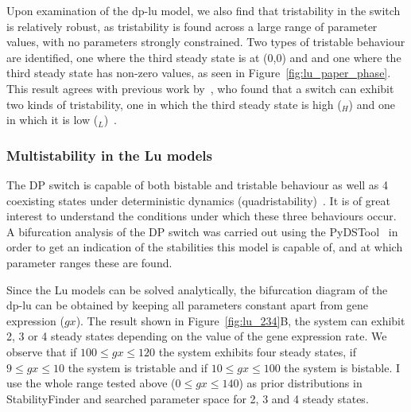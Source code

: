 Upon examination of the \acrshort{dp-lu} model, we also find that tristability in the switch is relatively robust, as tristability is found across a large range of parameter values, with no parameters strongly constrained. Two types of tristable behaviour are identified, one where the third steady state is at (0,0) and and one where the third steady state has non-zero values, as seen in Figure~\ref{fig:lu_paper_phase}. This result agrees with previous work by~\textcite{Guantes:2008gs}, who found that a switch can exhibit two kinds of tristability, one in which the third steady state is high ($_H$) and one in which it is low ($_L$)~\autocite{Guantes:2008gs}. %

\subsubsection{Multistability in the Lu models}
\label{sec:lu_234}
The DP switch is capable of both bistable and tristable behaviour as well as 4 coexisting states under deterministic dynamics (quadristability)~\autocite{Guantes:2008gs}. It is of great interest to understand the conditions under which these three behaviours occur. A bifurcation analysis of the DP switch was carried out using the PyDSTool~\autocite{Clewley:2012kj} in order to get an indication of the stabilities this model is capable of, and at which parameter ranges these are found.

Since the Lu models can be solved analytically, the bifurcation diagram of the \acrshort{dp-lu} can be obtained by keeping all parameters constant apart from gene expression ($gx$). The result shown in Figure~\ref{fig:lu_234}B, the system can exhibit 2, 3 or 4 steady states depending on the value of the gene expression rate. We observe that if $100 \leq gx\leq 120$ the system exhibits four steady states, if $9 \leq gx\leq 10$ the system is tristable and if $10 \leq gx\leq 100$ the system is bistable. I use the whole range tested above ($0 \leq gx\leq 140$) as prior distributions in StabilityFinder and searched parameter space for 2, 3 and 4 steady states.

